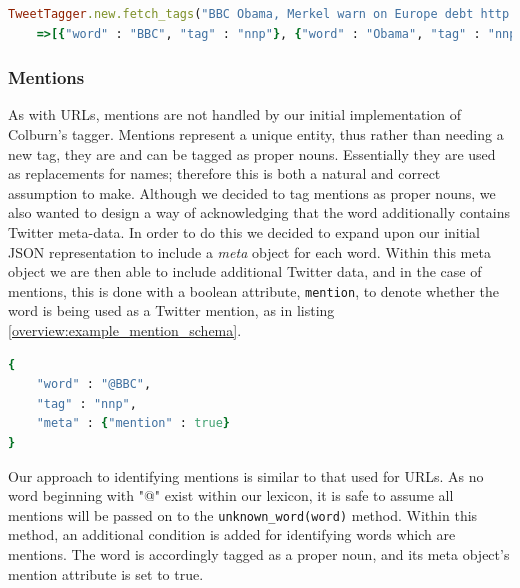 \begin{lstlisting}[language=Ruby, numbers=none, caption={Part of speech tagging for \emph{Example 2}, taking into account URLS as potential tags.}, label=overview:example_url_function]
TweetTagger.new.fetch_tags("BBC Obama, Merkel warn on Europe debt http://bbc.in/jfZW3I")
	=>[{"word" : "BBC", "tag" : "nnp"}, {"word" : "Obama", "tag" : "nnp"}, {"word" : ",", "tag" : "ppc"}, {"word" : "Merkel", "tag" : "nnp"}, {"word" : "warn", "tag" : "vbp"}, {"word" : "on", "tag" : "in"}, {"word" : "Europe", "tag" : "nnp"}, {"word" : "debt", "tag" : "nn"}, {"word" : "http://bbc.in/jfZW3I", "tag" : "url"}] 
\end{lstlisting}

\subsubsection{Mentions}

As with URLs, mentions are not handled by our initial implementation of Colburn's tagger. Mentions represent a unique entity, thus rather than needing a new tag, they are and can be tagged as proper nouns. Essentially they are used as replacements for names; therefore this is both a natural and correct assumption to make. Although we decided to tag mentions as proper nouns, we also wanted to design a way of acknowledging that the word additionally contains Twitter meta-data. In order to do this we decided to expand upon our initial JSON representation to include a \emph{meta} object for each word. Within this meta object we are then able to include additional Twitter data, and in the case of mentions, this is done with a boolean attribute, \texttt{mention}, to denote whether the word is being used as a Twitter mention, as in listing \ref{overview:example_mention_schema}.

\begin{lstlisting}[language=Ruby, numbers=none, caption={Example JSON structure for representing a mention word}, label=overview:example_mention_schema]
{
	"word" : "@BBC", 
	"tag" : "nnp",
	"meta" : {"mention" : true}
}
\end{lstlisting}

Our approach to identifying mentions is similar to that used for URLs. As no word beginning with "@" exist within our lexicon, it is safe to assume all mentions will be passed on to the \texttt{unknown\_word(word)} method. Within this method, an additional condition is added for identifying words which are mentions. The word is accordingly tagged as a proper noun, and its meta object's mention attribute is set to true.

